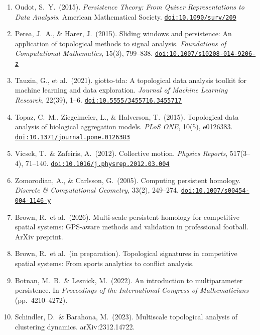 \begin{enumerate}[label=\arabic*., leftmargin=*, itemsep=0.35em]
  \item Oudot, S.\ Y.\ (2015). \emph{Persistence Theory: From Quiver Representations to Data Analysis}. American Mathematical Society. \href{https://doi.org/10.1090/surv/209}{\texttt{doi:10.1090/surv/209}}

  \item Perea, J.\ A., \& Harer, J.\ (2015). Sliding windows and persistence: An application of topological methods to signal analysis. \emph{Foundations of Computational Mathematics}, 15(3), 799--838. \href{https://doi.org/10.1007/s10208-014-9206-z}{\texttt{doi:10.1007/s10208-014-9206-z}}

  \item Tauzin, G., et al.\ (2021). giotto-tda: A topological data analysis toolkit for machine learning and data exploration. \emph{Journal of Machine Learning Research}, 22(39), 1--6. \href{https://doi.org/10.5555/3455716.3455717}{\texttt{doi:10.5555/3455716.3455717}}

  \item Topaz, C.\ M., Ziegelmeier, L., \& Halverson, T.\ (2015). Topological data analysis of biological aggregation models. \emph{PLoS ONE}, 10(5), e0126383. \href{https://doi.org/10.1371/journal.pone.0126383}{\texttt{doi:10.1371/journal.pone.0126383}}

  \item Vicsek, T.\ \& Zafeiris, A.\ (2012). Collective motion. \emph{Physics Reports}, 517(3--4), 71--140. \href{https://doi.org/10.1016/j.physrep.2012.03.004}{\texttt{doi:10.1016/j.physrep.2012.03.004}}

  \item Zomorodian, A., \& Carlsson, G.\ (2005). Computing persistent homology. \emph{Discrete \& Computational Geometry}, 33(2), 249--274. \href{https://doi.org/10.1007/s00454-004-1146-y}{\texttt{doi:10.1007/s00454-004-1146-y}}

  \item Brown, R.\ et al.\ (2026). Multi-scale persistent homology for competitive spatial systems: GPS-aware methods and validation in professional football. ArXiv preprint.

  \item Brown, R.\ et al.\ (in preparation). Topological signatures in competitive spatial systems: From sports analytics to conflict analysis.

  \item Botnan, M.\ B.\ \& Lesnick, M.\ (2022). An introduction to multiparameter persistence. In \emph{Proceedings of the International Congress of Mathematicians} (pp.\ 4210--4272).

  \item Schindler, D.\ \& Barahona, M.\ (2023). Multiscale topological analysis of clustering dynamics. arXiv:2312.14722.
\end{enumerate}
